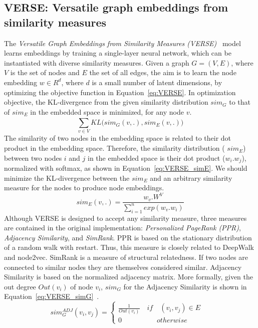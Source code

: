 \subsection{VERSE: Versatile graph embeddings from similarity measures}
\label{subsec:VERSE}
The \emph{Versatile Graph Embeddings from Similarity Measures (VERSE)}~ model learns embeddings by training a single-layer neural network, which can be instantiated with diverse similarity measures. Given a graph $G=(V,E)$, where $V$ is the set of nodes and $E$ the set of all edges, the aim is to learn the node embedding $w \in R^{d}$, where $d$ is a small number of latent dimensions, by optimizing the objective function in Equation~\ref{eq:VERSE}. In optimization objective, the KL-divergence from the given similarity distribution $sim_G$ to that of $sim_E$ in the embedded space is minimized, for any node $v$. 
\begin{equation}
\sum _{ v\in V }^{  }{ KL(sim_{ G }(v,.),sim_{ E } } (v,.))
\label{eq:VERSE}
\end{equation}
The similarity of two nodes in the embedding space is related to their dot product in the embedding space. Therefore, the similarity distribution ( $sim_E$) between two nodes $i$ and $j$ in the embedded space is their dot product ($w_i . w_j$), normalized with softmax, as shown in Equation~\ref{eq:VERSE_simE}. We should minimize the KL-divergence between the $sim_{ E }$ and an arbitrary similarity measure for the nodes to produce node embeddings. 
\begin{equation}
sim_{ E }(v,.)=\frac{ w_{ v }.W^{ V } }{ \sum _{ i=1 }^{ n }{ exp(w_{ v }.w_{ i }) }  }\label{eq:VERSE_simE}
\end{equation}
Although VERSE is designed to accept any similarity measure, three measures are contained in the original implementation: \emph{Personalized PageRank (PPR)},  \emph{Adjacency Similarity}, and  \emph{SimRank}. PPR is based on the stationary distribution of a random walk with restart. Thus, this measure is closely related to DeepWalk and node2vec. SimRank is a measure of structural relatedness. If two nodes are connected to similar nodes they are themselves considered similar. Adjacency Similarity is based on the normalized adjacency matrix. More formally, given the out degree $Out(v_{i})$ of node $v_{i}$, $sim_{ G }$ for the Adjacency Similarity is shown in Equation~\ref{eq:VERSE_simG}~. 
\begin{equation}
sim^{ ADJ }_{ G }(v_{ i },v_{ j })=\left\{ \begin{matrix} \frac { 1 }{ Out(v_{ i }) } \quad if\quad (v_{ i },v_{ j })\in E\quad  \\ 0\quad \qquad \qquad otherwise \end{matrix} \right.\label{eq:VERSE_simG}
\end{equation}
